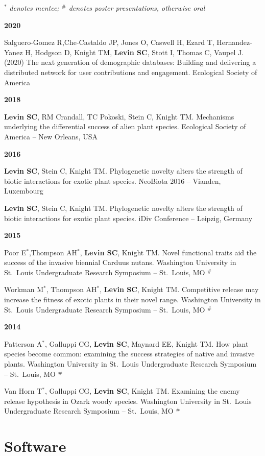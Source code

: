 \documentclass[11pt,]{article}
\begin{document}
\(^\ast\) \emph{denotes mentee; \(^\#\) denotes poster presentations,
otherwise oral}

\textbf{2020}

Salguero-Gomez R,Che-Castaldo JP, Jones O, Caswell H, Ezard T,
Hernandez-Yanez H, Hodgson D, Knight TM, \textbf{Levin SC}, Stott I,
Thomas C, Vaupel J. (2020) The next generation of demographic databases:
Building and delivering a distributed network for user contributions and
engagement. Ecological Society of America

\textbf{2018}

\textbf{Levin SC}, RM Crandall, TC Pokoski, Stein C, Knight TM.
Mechanisms underlying the differential success of alien plant species.
Ecological Society of America -- New Orleans, USA

\textbf{2016}

\textbf{Levin SC}, Stein C, Knight TM. Phylogenetic novelty alters the
strength of biotic interactions for exotic plant species. NeoBiota 2016
-- Vianden, Luxembourg

\textbf{Levin SC}, Stein C, Knight TM. Phylogenetic novelty alters the
strength of biotic interactions for exotic plant species. iDiv
Conference -- Leipzig, Germany

\textbf{2015}

Poor E\(^\ast\),Thompson AH\(^\ast\), \textbf{Levin SC}, Knight TM.
Novel functional traits aid the success of the invasive biennial Carduus
nutans. Washington University in St.~Louis Undergraduate Research
Symposium -- St.~Louis, MO \(^\#\)

Workman M\(^\ast\), Thompson AH\(^\ast\), \textbf{Levin SC}, Knight TM.
Competitive release may increase the fitness of exotic plants in their
novel range. Washington University in St.~Louis Undergraduate Research
Symposium -- St.~Louis, MO \(^\#\)

\textbf{2014}

Patterson A\(^\ast\), Galluppi CG, \textbf{Levin SC}, Maynard EE, Knight
TM. How plant species become common: examining the success strategies of
native and invasive plants. Washington University in St.~Louis
Undergraduate Research Symposium -- St.~Louis, MO \(^\#\)

Van Horn T\(^\ast\), Galluppi CG, \textbf{Levin SC}, Knight TM.
Examining the enemy release hypothesis in Ozark woody species.
Washington University in St.~Louis Undergraduate Research Symposium --
St.~Louis, MO \(^\#\)

\hypertarget{software}{%
\section{Software}\label{software}}
\end{document}
